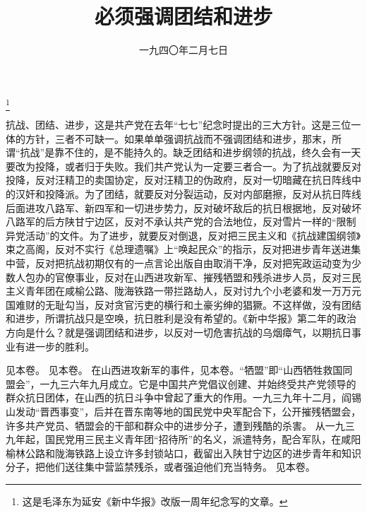 
\title{必须强调团结和进步}
\date{一九四〇年二月七日}
\thanks{这是毛泽东为延安《新中华报》改版一周年纪念写的文章。}
\maketitle


抗战、团结、进步，这是共产党在去年“七七”纪念时提出的三大方针。这是三位一体的方针，三者不可缺一。如果单单强调抗战而不强调团结和进步，那末，所谓“抗战”是靠不住的，是不能持久的。缺乏团结和进步纲领的抗战，终久会有一天要改为投降，或者归于失败。我们共产党认为一定要三者合一。为了抗战就要反对投降，反对汪精卫的卖国协定，反对汪精卫的伪政府，反对一切暗藏在抗日阵线中的汉奸和投降派。为了团结，就要反对分裂运动，反对内部磨擦，反对从抗日阵线后面进攻八路军、新四军和一切进步势力，反对破坏敌后的抗日根据地，反对破坏八路军的后方陕甘宁边区，反对不承认共产党的合法地位，反对雪片一样的“限制异党活动”的文件。为了进步，就要反对倒退，反对把三民主义和《抗战建国纲领》束之高阁，反对不实行《总理遗嘱》上“唤起民众”的指示，反对把进步青年送进集中营，反对把抗战初期仅有的一点言论出版自由取消干净，反对把宪政运动变为少数人包办的官僚事业，反对在山西进攻新军、摧残牺盟和残杀进步人员，反对三民主义青年团在咸榆公路、陇海铁路一带拦路劫人，反对讨九个小老婆和发一万万元国难财的无耻勾当，反对贪官污吏的横行和土豪劣绅的猖獗。不这样做，没有团结和进步，所谓抗战只是空唤，抗日胜利是没有希望的。《新中华报》第二年的政治方向是什么？就是强调团结和进步，以反对一切危害抗战的乌烟瘴气，以期抗日事业有进一步的胜利。


\begin{maonote}
见本卷。
见本卷。
在山西进攻新军的事件，见本卷。“牺盟”即“山西牺牲救国同盟会”，一九三六年九月成立。它是中国共产党倡议创建、并始终受共产党领导的群众抗日团体，在山西的抗日斗争中曾起了重大的作用。一九三九年十二月，阎锡山发动“晋西事变”，后并在晋东南等地的国民党中央军配合下，公开摧残牺盟会，许多共产党员、牺盟会的干部和群众中的进步分子，遭到残酷的杀害。
从一九三九年起，国民党用三民主义青年团“招待所”的名义，派遣特务，配合军队，在咸阳榆林公路和陇海铁路上设立许多封锁站口，截留出入陕甘宁边区的进步青年和知识分子，把他们送往集中营监禁残杀，或者强迫他们充当特务。
见本卷。
\end{maonote}
